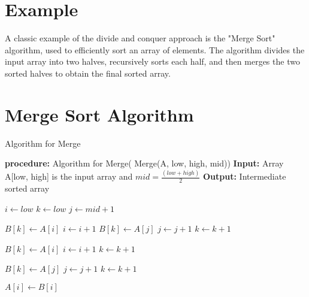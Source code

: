 \documentclass[a4paper, 12pt]{report}
\begin{document}
    
    \section {Example}

    A classic example of the divide and conquer approach is the "Merge Sort" algorithm, used to efficiently sort an array of elements. The algorithm divides the input array into two halves, recursively sorts each half, and then merges the two sorted halves to obtain the final sorted array.\\

    \newpage
    
    \section{Merge Sort Algorithm}
            
        \begin{algorithm}
        \caption{Algorithm for Merge}
            
            \begin{algorithmic}[1]
            
                \State \textbf{procedure:} Algorithm for Merge( Merge(A, low, high, mid))
                \State \textbf{Input:} Array A[low, high] is the input array and $mid = \frac{(low+high)}{2}$
                \State \textbf{Output:} Intermediate sorted array
                
                \State $i \gets low$
                \State $k \gets low$
                \State $j \gets mid + 1$
                
                        \State $B[k] \gets A[i]$ 
                        \State $i \gets i + 1$
                    \Else
                        \State $B[k] \gets A[j]$
                        \State $j \gets j + 1$
                    \EndIf
                    \State $k \gets k + 1$
                \EndWhile
                
                    \State $B[k] \gets A[i]$
                    \State $i \gets i + 1$
                    \State $k \gets k + 1$
                \EndWhile
                
                    \State $B[k] \gets A[j]$
                    \State $j \gets j + 1$
                    \State $k \gets k + 1$
                \EndWhile
    
                    \State $A[i] \gets B[i]$
                \EndFor
                    
            \end{algorithmic}
        \end{algorithm}
\end{document}
